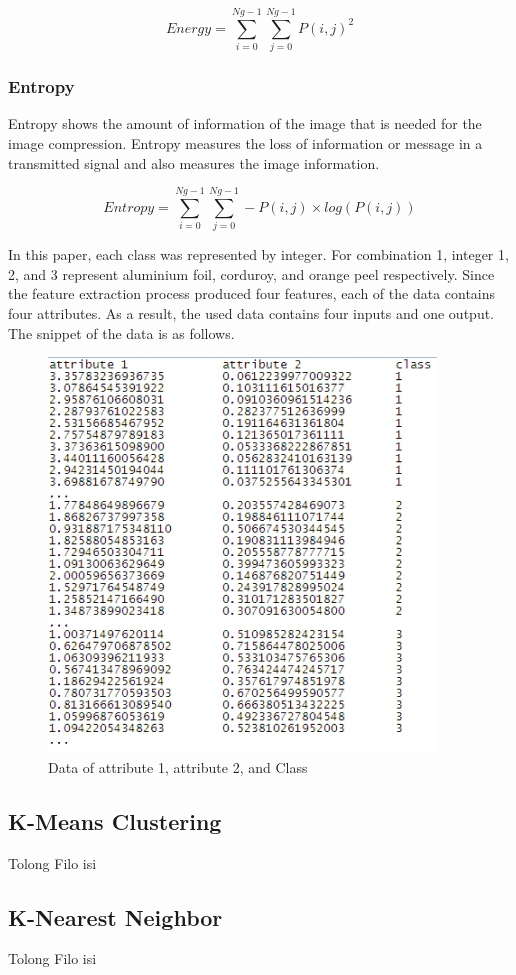 \documentclass[conference]{IEEEtran}
\begin{document}
\begin{equation}
Energy = \sum_{i=0}^{Ng-1}\sum_{j=0}^{Ng-1}P(i,j)^2
\end{equation}

\subsubsection{Entropy}
Entropy shows the amount of information of the image that is needed for the image compression. Entropy measures the loss of information or message in a transmitted signal and also measures the image information. 

\begin{equation}
Entropy = \sum_{i=0}^{Ng-1}\sum_{j=0}^{Ng-1}-P(i,j)\times log(P(i,j))
\end{equation}

In this paper, each class was represented by integer. For combination 1, integer 1, 2, and 3 represent aluminium foil, corduroy, and orange peel respectively. Since the feature extraction process produced four features, each of the data contains four attributes. As a result, the used data contains four inputs and one output. The snippet of the data is as follows. 

\begin{figure}[!t]
\centering
\includegraphics[width=2.3 in]{data_in.jpg}
\caption{Data of attribute 1, attribute 2, and Class}
\label{fig:data_feature_class}
\end{figure}



\subsection{K-Means Clustering}
Tolong Filo isi

\subsection{K-Nearest Neighbor}
Tolong Filo isi
\end{document}
